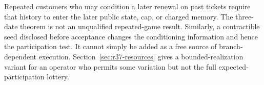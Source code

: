 Repeated customers who may condition a later renewal on past tickets require that history to enter the later public state, cap, or charged memory. The three-date theorem is not an unqualified repeated-game result. Similarly, a contractible seed disclosed before acceptance changes the conditioning information and hence the participation test. It cannot simply be added as a free source of branch-dependent execution. Section~\ref{sec:r37-resources} gives a bounded-realization variant for an operator who permits some variation but not the full expected-participation lottery.
